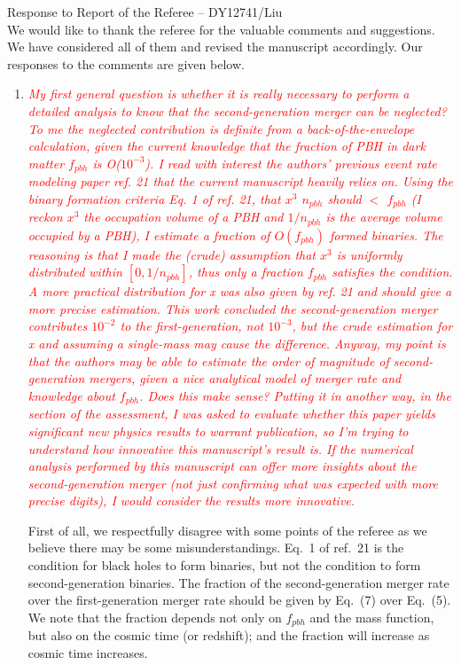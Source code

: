\documentclass[
preprint,          %
superscriptaddress,%
amsmath,           %
amssymb,           %
aps,               %
prl,               %
notitlepage,       %
longbibliography,  %
floatfix,          %
nofootinbib,
onecolumn,
]{revtex4-1}
\newcommand{\red}[1]{\textcolor{red}{#1}}
\begin{document}
\noindent Response to Report of the Referee -- DY12741/Liu\\

We would like to thank the referee for the valuable comments and suggestions. We have considered all of them and revised the manuscript accordingly.
Our responses to the comments are given below.

\begin{enumerate}
	
\item \red{\it My first general question is whether it is really necessary to perform a detailed analysis to know that the second-generation merger can be neglected? To me the neglected contribution is definite from a back-of-the-envelope calculation, given the current knowledge that the fraction of PBH in dark matter $f_{pbh}$ is O($10^{-3}$). I read with interest the authors' previous event rate modeling paper ref. 21 that the current manuscript heavily relies on. Using the binary formation criteria Eq. 1 of ref. 21, that $x^3$ $n_{pbh}$ should $<$ $f_{pbh}$ (I reckon $x^3$ the occupation volume of a PBH and $1/n_{pbh}$ is the average volume occupied by a PBH), I estimate a fraction of $O(f_{pbh})$ formed binaries. The reasoning is that I made the (crude) assumption that $x^3$ is uniformly distributed within $[0, 1/n_{pbh}]$, thus only a fraction $f_{pbh}$ satisfies the condition. A more practical distribution for x was also given by ref. 21 and should give a more precise estimation. This work concluded the second-generation merger contributes $10^{-2}$ to the first-generation, not $10^{-3}$, but the crude estimation for x and assuming a single-mass may cause the difference. Anyway, my point is that the authors may be able to estimate the order of magnitude of second-generation mergers, given a nice analytical model of merger rate and knowledge about $f_{pbh}$. Does this make sense? Putting it in another way, in the section of the assessment, I was asked to evaluate whether this paper yields significant new physics results to warrant publication, so I'm trying to understand how innovative this manuscript's result is. If the numerical analysis performed by this manuscript can offer more insights about the second-generation merger (not just confirming what was expected with more precise digits), I would consider the results more innovative.}

First of all, we respectfully disagree with some points of the referee as we believe there may be some misunderstandings. Eq.~1 of ref.~21 is the condition for black holes to form binaries, but not the condition to form second-generation binaries. The fraction of the second-generation merger rate over the first-generation merger rate should be given by Eq.~(7) over Eq.~(5). We note that the fraction depends not only on $f_{pbh}$ and the mass function, but also on the cosmic time (or redshift); and the fraction will increase as cosmic time increases.


\end{enumerate}
\end{document}
